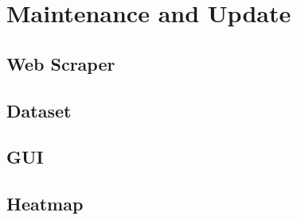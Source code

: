 \documentclass[main]{subfiles}
\begin{document}
\section{Maintenance and Update}
\subsection{Web Scraper}


\subsection{Dataset}

\subsection{GUI}

\subsection{Heatmap}
\end{document}
